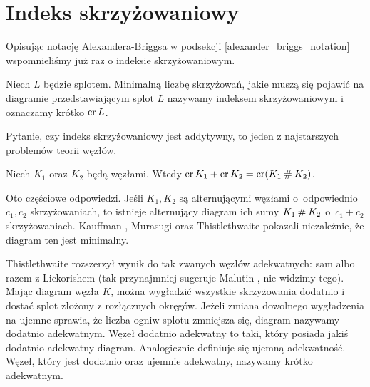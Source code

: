 
\section{Indeks skrzyżowaniowy}
Opisując notację Alexandera-Briggsa w podsekcji \ref{alexander_briggs_notation} wspomnieliśmy już raz o indeksie skrzyżowaniowym.

%
\begin{definition}
    Niech $L$ będzie splotem.
    Minimalną liczbę skrzyżowań, jakie muszą się pojawić na diagramie przedstawiającym splot $L$ nazywamy indeksem skrzyżowaniowym i oznaczamy krótko $\operatorname{cr} L$.
\end{definition}

Pytanie, czy indeks skrzyżowaniowy jest addytywny, to jeden z najstarszych problemów teorii węzłów.

\begin{conjecture}
%
%
\label{con:crossing_additive}%
    Niech $K_1$ oraz $K_2$ będą węzłami.
    Wtedy $\operatorname{cr} K_1 + \operatorname{cr} K_2 = \operatorname{cr}(K_1 \mathbin{\#} K_2)$.
\end{conjecture}

Oto częściowe odpowiedzi.
Jeśli $K_1, K_2$ są alternującymi węzłami o~odpowiednio $c_1, c_2$ skrzyżowaniach, to istnieje alternujący diagram ich sumy $K_1 \mathbin{\#} K_2$ o~$c_1 + c_2$ skrzyżowaniach.
%
Kauffman \cite[twierdzenie 2.10]{kauffman1987}, Murasugi \cite[wniosek 6]{murasugi1987} oraz Thistlethwaite \cite[wniosek 1]{thistlethwaite1987} pokazali niezależnie, że diagram ten jest minimalny.
%
%
%

Thistlethwaite rozszerzył wynik do tak zwanych węzłów adekwatnych: sam \cite{thistlethwaite1988} albo razem z Lickorishem \cite{lickorish1988} (tak przynajmniej sugeruje Malutin \cite[s. 3]{malyutin2016}, nie widzimy tego).
%
%
%
Mając diagram węzła $K$, można wygładzić wszystkie skrzyżowania dodatnio i dostać splot złożony z rozłącznych okręgów.
Jeżeli zmiana dowolnego wygładzenia na ujemne sprawia, że liczba ogniw splotu zmniejsza się, diagram nazywamy dodatnio adekwatnym.
Węzeł dodatnio adekwatny to taki, który posiada jakiś dodatnio adekwatny diagram.
Analogicznie definiuje się ujemną adekwatność.
Węzeł, który jest dodatnio oraz ujemnie adekwatny, nazywamy krótko adekwatnym.

